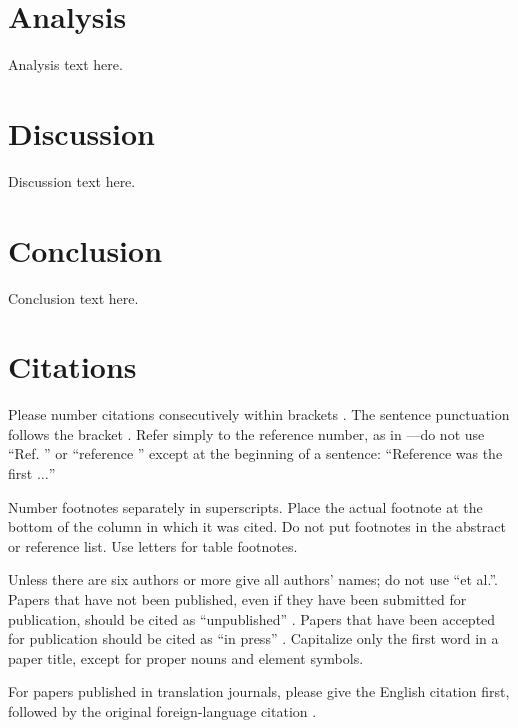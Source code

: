 \documentclass[conference]{IEEEtran}
\begin{document}
\section{Analysis}


Analysis text here.


\section*{Discussion}


Discussion text here.

\section{Conclusion}


Conclusion text here.

\section*{Citations}

Please number citations consecutively within brackets \cite{b1}. The 
sentence punctuation follows the bracket \cite{b2}. Refer simply to the reference 
number, as in \cite{b3}---do not use ``Ref. \cite{b3}'' or ``reference \cite{b3}'' except at 
the beginning of a sentence: ``Reference \cite{b3} was the first $\ldots$''

Number footnotes separately in superscripts. Place the actual footnote at 
the bottom of the column in which it was cited. Do not put footnotes in the 
abstract or reference list. Use letters for table footnotes.

Unless there are six authors or more give all authors' names; do not use 
``et al.''. Papers that have not been published, even if they have been 
submitted for publication, should be cited as ``unpublished'' \cite{b4}. Papers 
that have been accepted for publication should be cited as ``in press'' \cite{b5}. 
Capitalize only the first word in a paper title, except for proper nouns and 
element symbols.

For papers published in translation journals, please give the English 
citation first, followed by the original foreign-language citation \cite{b6}.
\end{document}
